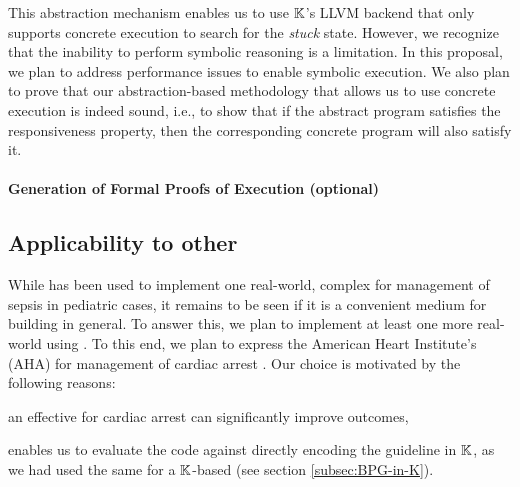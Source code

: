 This abstraction mechanism enables us to use $\mathbb{K}$'s LLVM backend
that only supports concrete execution to search for the \emph{stuck}
state. However, we recognize that the inability to perform symbolic
reasoning is a limitation. In this proposal, we plan to
address performance issues to enable symbolic execution.
We also plan to prove that our abstraction-based methodology
that allows us to use concrete execution is indeed sound, i.e.,
to show that if the abstract program satisfies the responsiveness
property, then the corresponding concrete program will also satisfy it.

\paragraph{Generation of Formal Proofs of Execution (optional)}

\subsection{Applicability to other \CDSSs{}}\label{subsec:applicability}

While \MediK{} has been used to implement one real-world, complex
\CDSSs{} for management of sepsis in pediatric cases, it remains
to be seen if it is a convenient medium for building \CDSSs{} in general.
To answer this, we plan to implement at least one more real-world \CDSS{}
using \MediK{}. To this end, we plan to express the American Heart Institute's
(AHA) \BPG{} for management of cardiac arrest \cite{AHAUrl}. Our choice
is motivated by the following reasons:
\begin{enumerate*}[label=(\roman*)]
  \item an effective \CDSS{} for cardiac arrest can significantly improve
    outcomes,
  \item enables us to evaluate the \MediK{} code against directly encoding
    the guideline in $\mathbb{K}$, as we had used the same \BPG{} for a $\mathbb{K}$-based \CDSSs{}
    (see section \ref{subsec:BPG-in-K}).
\end{enumerate*}


